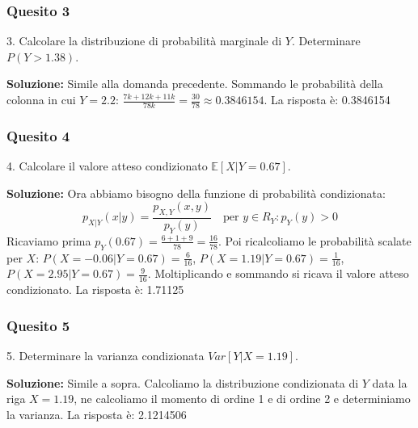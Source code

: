 \documentclass[12pt, a4paper]{article}
\begin{document}
\subsubsection*{Quesito 3}
3. Calcolare la distribuzione di probabilità marginale di $Y$. Determinare $P(Y > 1.38)$.

\textbf{Soluzione:}
Simile alla domanda precedente. Sommando le probabilità della colonna in cui $Y=2.2$: $\frac{7k+12k+11k}{78k} = \frac{30}{78} \approx 0.3846154$.
La risposta è: 0.3846154

\subsubsection*{Quesito 4}
4. Calcolare il valore atteso condizionato $\mathbb{E}[X|Y=0.67]$.

\textbf{Soluzione:}
Ora abbiamo bisogno della funzione di probabilità condizionata:
$$ p_{X|Y}(x|y) = \frac{p_{X,Y}(x,y)}{p_Y(y)} \quad \text{per } y \in R_Y : p_Y(y)>0 $$
Ricaviamo prima $p_Y(0.67) = \frac{6+1+9}{78} = \frac{16}{78}$. 
Poi ricalcoliamo le probabilità scalate per $X$: $P(X=-0.06|Y=0.67) = \frac{6}{16}$, $P(X=1.19|Y=0.67) = \frac{1}{16}$, $P(X=2.95|Y=0.67) = \frac{9}{16}$.
Moltiplicando e sommando si ricava il valore atteso condizionato.
La risposta è: 1.71125

\subsubsection*{Quesito 5}
5. Determinare la varianza condizionata $Var[Y|X=1.19]$.

\textbf{Soluzione:}
Simile a sopra. Calcoliamo la distribuzione condizionata di $Y$ data la riga $X=1.19$, ne calcoliamo il momento di ordine 1 e di ordine 2 e determiniamo la varianza.
La risposta è: 2.1214506
\end{document}
